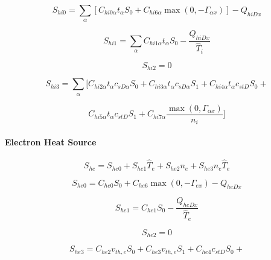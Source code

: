 \documentclass[11pt]{article}
\begin{document}
\begin{equation}
S_{hi0}=\sum_{\alpha}\left[ C_{hi0\alpha}t_{\alpha}S_{0}+C_{hi6\alpha}\max%
\left( 0,-\Gamma_{\alpha x}\right) \right] -Q_{hiDx}   \label{99}
\end{equation}

\begin{equation}
S_{hi1}=\sum_{\alpha}C_{hi1\alpha}t_{\alpha}S_{0}-\frac{Q_{hiDx}}{\widehat
{T}_{i}}   \label{100}
\end{equation}

\begin{equation}
S_{hi2}=0   \label{101}
\end{equation}

\begin{equation*}
S_{hi3}=\sum_{\alpha}[C_{hi2\alpha}t_{\alpha}c_{sD\alpha}S_{0}+C_{hi3\alpha
}t_{\alpha}c_{sD\alpha}S_{1}+C_{hi4\alpha}t_{\alpha}c_{stD}S_{0}+ 
\end{equation*}

\begin{equation}
C_{hi5\alpha}t_{\alpha}c_{stD}S_{1}+C_{hi7\alpha}\frac{\max\left(
0,\Gamma_{\alpha x}\right) }{n_{i}}]   \label{102}
\end{equation}

\bigskip

\paragraph{\protect\bigskip Electron Heat Source}

\begin{equation}
S_{he}=S_{he0}+S_{he1}\widehat{T}_{e}+S_{he2}n_{e}+S_{he3}n_{e}\widehat{T}%
_{e}   \label{103}
\end{equation}

\begin{equation}
S_{he0}=C_{he0}S_{0}+C_{he6}\max\left( 0,-\Gamma_{ex}\right) -Q_{heDx} 
\label{104}
\end{equation}

\begin{equation}
S_{he1}=C_{he1}S_{0}-\frac{Q_{heDx}}{\widehat{T}_{e}}   \label{105}
\end{equation}

\begin{equation}
S_{he2}=0   \label{106}
\end{equation}

\begin{equation*}
S_{he3}=C_{he2}v_{th,e}S_{0}+C_{he3}v_{th,e}S_{1}+C_{he4}c_{stD}S_{0}+ 
\end{equation*}
\end{document}

